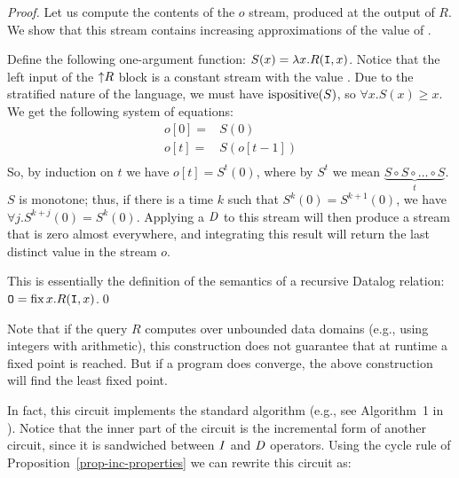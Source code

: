\begin{proof}
Let us compute the contents of the $o$ stream, produced at the output
of $R$.  We show that this stream contains increasing approximations of the value of .

Define the following one-argument function: $S(x) = \lambda x . R(\mbox{\texttt{I}}, x)$.
Notice that the left input of the ${\uparrow}R$ block is a constant stream
with the value .  Due to the stratified nature of the language,
we must have $\mbox{ispositive}(S)$, so $\forall x . S(x) \geq x$.
We get the following system of equations:
$$
\begin{aligned}
o[0] =& S(0) \\
o[t] =& S(o[t-1]) \\
\end{aligned}
$$
So, by induction on $t$ we have $o[t] = S^t(0)$, where by
$S^t$ we mean $\underbrace{S \circ S \circ \ldots \circ S}_{t}$.
$S$ is monotone; thus, if there is a time $k$ such that $S^k(0) = S^{k+1}(0)$, we have
$\forall j . S^{k+j}(0) = S^k(0)$.  Applying a $\mathit{D}$ to this stream
will then produce a stream that is zero almost everywhere, and integrating
this result will return the last distinct value in the stream $o$.

This is essentially the definition of the semantics of a recursive Datalog relation:
$\mbox{\texttt{O}} = \mbox{fix}\,x.R(\mbox{\texttt{I}}, x)$.\qed
\end{proof}

Note that if the query $R$ computes over unbounded data domains (e.g.,
using integers with arithmetic), this construction does not guarantee
that at runtime a fixed point is reached.  But if a program does converge, the
above construction will find the least fixed point.

In fact, this circuit implements the standard 
algorithm (e.g., see Algorithm~1 in \cite{greco-sldm15}).
Notice that the inner part of the circuit is the incremental
form of another circuit, since it is sandwiched between $\mathit{I}$ and $\mathit{D}$ operators.
Using the cycle rule of Proposition~\ref{prop-inc-properties} we can rewrite this circuit as:
%
\begin{center}
\end{center}

